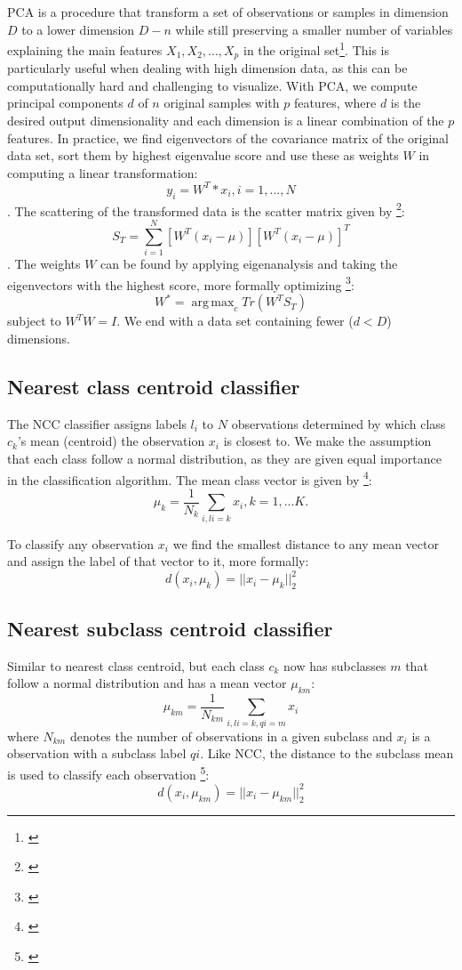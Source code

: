 \documentclass[journal]{IEEEtran}
\DeclareMathOperator*{\argmax}{arg\,max}
\begin{document}
PCA is a procedure that transform a set of observations or samples in dimension $D$ to a lower dimension $D-n$ while still preserving a smaller number of variables explaining the main features $X_{1}, X_{2}, ..., X_{p}$ in the original set\footnote{\cite{Casella}}. This is particularly useful when dealing with high dimension data, as this can be computationally hard and challenging to visualize. With PCA, we compute principal components $d$ of $n$ original samples with $p$ features, where $d$ is the desired output dimensionality and each dimension is a linear combination of the $p$ features. In practice, we find eigenvectors of the covariance matrix of the original data set, sort them by highest eigenvalue score and use these as weights $W$ in computing a linear transformation: $$y_{i} = W^T*x_{i}, i = 1, ..., N$$. The scattering of the transformed data is the scatter matrix given by \footnote{\cite{Iosifidis2017}}: $$S_{T} = \sum_{i=1}^{N} [W^T(x_{i}-\mu)][W^T(x_{i}-\mu)]^T$$. The weights $W$ can be found by applying eigenanalysis and taking the eigenvectors with the  highest score, more formally optimizing \footnote{\cite{Iosifidis2017}}: \[ W^* = \argmax_c Tr (W^TS_{T}) \] subject to $W^TW=I$. We end with a data set containing fewer ($d < D$) dimensions.

\subsection{Nearest class centroid classifier}

The NCC classifier assigns labels $l_{i}$ to $N$ observations determined by which class $c_{k}$'s mean (centroid) the observation $x_{i}$ is closest to. We make the assumption that each class follow a normal distribution, as they are given equal importance in the classification algorithm. The mean class vector is given by \footnote{\cite{Iosifidis2017}}: $$ \mu_{k} = \frac{1}{N_{k}} \sum_{i,li=k}^{} x_{i}, k = 1, ... K.$$

To classify any observation $x_{i}$ we find the smallest distance to any mean vector and assign the label of that vector to it, more formally: $$ d(x_{i},\mu_{k}) = ||x_{i}-\mu_{k}||^2_{2} $$

\subsection{Nearest subclass centroid classifier}

Similar to nearest class centroid, but each class $c_{k}$ now has subclasses $m$ that follow a normal distribution and has a mean vector $\mu_{km}$: $$ \mu_{km} = \frac{1}{N_{km}} \sum_{i,li=k, qi=m}^{} x_{i} $$ where $N_{km}$ denotes the number of observations in a given subclass and $x_{i}$ is a observation with a subclass label $qi$. Like NCC, the distance to the subclass mean is used to classify each observation \footnote{\cite{Iosifidis2017}}: $$ d(x_{i},\mu_{km}) = ||x_{i}-\mu_{km}||^2_{2} $$
\end{document}
